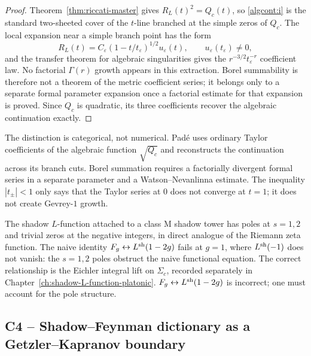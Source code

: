 \begin{proof}
Theorem~\ref{thm:riccati-master} gives $R_L(t)^2=Q_c(t)$, so
\ref{algcont:i} is the standard two-sheeted cover of the $t$-line
branched at the simple zeros of $Q_c$. The local expansion near a
simple branch point has the form
\[
R_L(t)=C_\varepsilon(1-t/t_\varepsilon)^{1/2}
u_\varepsilon(t),
\qquad
u_\varepsilon(t_\varepsilon)\ne0,
\]
and the transfer theorem for algebraic singularities gives the
$r^{-3/2}t_\varepsilon^{-r}$ coefficient law. No factorial
$\Gamma(r)$ growth appears in this extraction. Borel summability is
therefore not a theorem of the metric coefficient series; it belongs
only to a separate formal parameter expansion once a factorial
estimate for that expansion is proved. Since $Q_c$ is quadratic, its
three coefficients recover the algebraic continuation exactly.
\end{proof}

\begin{remark}
\label{rem:convergent-pade}
The distinction is categorical, not numerical. Pad\'e uses ordinary
Taylor coefficients of the algebraic function $\sqrt{Q_c}$ and
reconstructs the continuation across its branch cuts. Borel summation
requires a factorially divergent formal series in a separate parameter
and a Watson--Nevanlinna estimate. The inequality $|t_\pm|<1$ only
says that the Taylor series at $0$ does not converge at $t=1$; it does
not create Gevrey-$1$ growth.
\end{remark}

\begin{remark}[$L$-function poles at $s = 1, 2$]
\label{rem:shadow-L-poles}
The shadow $L$-function attached to a class M shadow tower has
poles at $s = 1, 2$ and trivial zeros at the negative integers, in
direct analogue of the Riemann zeta function. The naive identity
$F_g \leftrightarrow L^{\rm sh}(1 - 2g)$ fails at $g = 1$, where
$L^{\rm sh}(-1)$ does not vanish: the $s = 1, 2$ poles obstruct the
naive functional equation. The correct relationship is the Eichler
integral lift on $\Sigma_c$, recorded separately in
Chapter~\ref{ch:shadow-L-function-platonic}. $F_g \leftrightarrow L^{\rm sh}(1 - 2g)$ is incorrect; one must
account for the pole structure.
\end{remark}

\subsection{C4 -- Shadow--Feynman dictionary as a Getzler--Kapranov boundary}
\label{sec:c4-shadow-feynman}

